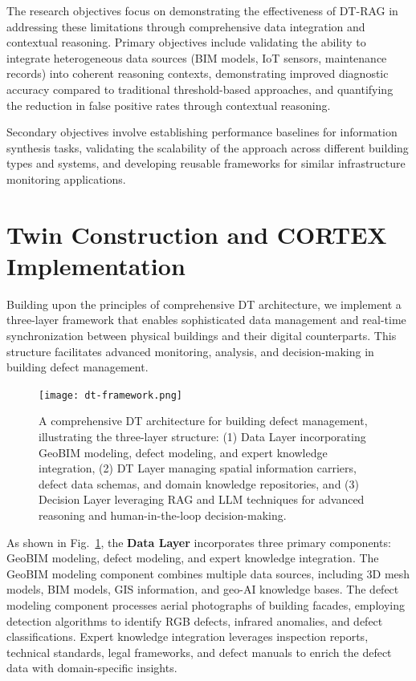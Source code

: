The research objectives focus on demonstrating the effectiveness of DT-RAG in addressing these limitations through comprehensive data integration and contextual reasoning. Primary objectives include validating the ability to integrate heterogeneous data sources (BIM models, IoT sensors, maintenance records) into coherent reasoning contexts, demonstrating improved diagnostic accuracy compared to traditional threshold-based approaches, and quantifying the reduction in false positive rates through contextual reasoning.

Secondary objectives involve establishing performance baselines for information synthesis tasks, validating the scalability of the approach across different building types and systems, and developing reusable frameworks for similar infrastructure monitoring applications.

\section{Twin Construction and CORTEX Implementation}

Building upon the principles of comprehensive DT architecture, we implement a three-layer framework that enables sophisticated data management and real-time synchronization between physical buildings and their digital counterparts. This structure facilitates advanced monitoring, analysis, and decision-making in building defect management.

\begin{figure}[htbp]
\centering
\texttt{[image: dt-framework.png]}
\caption{A comprehensive DT architecture for building defect management, illustrating the three-layer structure: (1) Data Layer incorporating GeoBIM modeling, defect modeling, and expert knowledge integration, (2) DT Layer managing spatial information carriers, defect data schemas, and domain knowledge repositories, and (3) Decision Layer leveraging RAG and LLM techniques for advanced reasoning and human-in-the-loop decision-making.}
\label{fig:dt-framework-building}
\end{figure}

As shown in Fig.~\ref{fig:dt-framework-building}, the \textbf{Data Layer} incorporates three primary components: GeoBIM modeling, defect modeling, and expert knowledge integration. The GeoBIM modeling component combines multiple data sources, including 3D mesh models, BIM models, GIS information, and geo-AI knowledge bases. The defect modeling component processes aerial photographs of building facades, employing detection algorithms to identify RGB defects, infrared anomalies, and defect classifications. Expert knowledge integration leverages inspection reports, technical standards, legal frameworks, and defect manuals to enrich the defect data with domain-specific insights.

